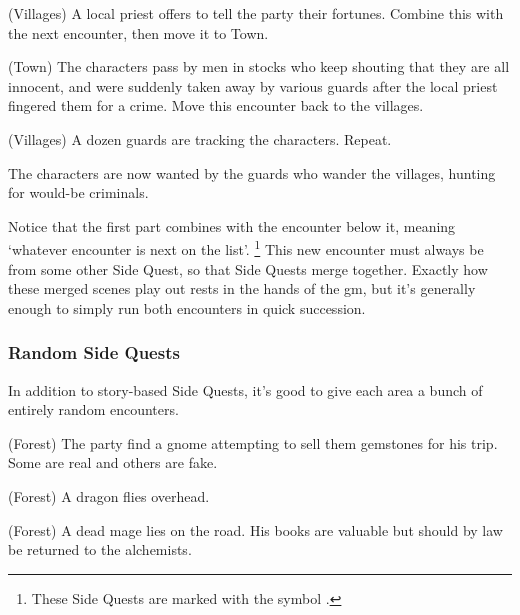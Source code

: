 \begin{multicols}{2}
\begin{list}{\sqn}{}

  \item[\sqr\squash]
  (Villages) A local priest offers to tell the party their fortunes.  Combine this with the next encounter, then move it to Town.

  \item
  (Town) The characters pass by men in stocks who keep shouting that they are all innocent, and were suddenly taken away by various guards after the local priest fingered them for a crime.  Move this encounter back to the villages.

  \item
  (Villages) A dozen guards are tracking the characters. Repeat.

\end{list}

The characters are now wanted by the guards who wander the villages, hunting for would-be criminals.

Notice that the first part combines with the encounter below it, meaning `whatever encounter is next on the list'.%
\footnote{These Side Quests are marked with the symbol \squash.}
This new encounter must always be from some other Side Quest, so that Side Quests merge together.
Exactly how these merged scenes play out rests in the hands of the \gls{gm}, but it's generally enough to simply run both encounters in quick succession.

\subsubsection{Random Side Quests}

In addition to story-based Side Quests, it's good to give each area a bunch of entirely random encounters.

\begin{list}{\sqn}{}

  \item{(Forest) The party find a gnome attempting to sell them gemstones for his trip. Some are real and others are fake.}

  \item{(Forest) A dragon flies overhead.}

  \item
  (Forest) A dead mage lies on the road. His books are valuable but should by law be returned to the alchemists.

\end{list}


\end{multicols}
